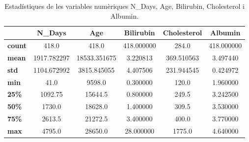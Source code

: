 \begin{table}[H]
\centering
\begin{tabular}{|l|c|c|c|c|c|}
\hline
\textbf{} & \textbf{N\_Days} & \textbf{Age} & \textbf{Bilirubin} & \textbf{Cholesterol} & \textbf{Albumin} \\ \hline
\textbf{count} & 418.0 & 418.0 & 418.000000 & 284.0 & 418.000000 \\ \hline
\textbf{mean} & 1917.782297 & 18533.351675 & 3.220813 & 369.510563 & 3.497440 \\ \hline
\textbf{std} & 1104.672992 & 3815.845055 & 4.407506 & 231.944545 & 0.424972 \\ \hline
\textbf{min} & 41.0 & 9598.0 & 0.300000 & 120.0 & 1.960000 \\ \hline
\textbf{25\%} & 1092.75 & 15644.5 & 0.800000 & 249.5 & 
3.242500 \\ \hline
\textbf{50\%} & 1730.0 & 18628.0 & 1.400000 & 309.5 & 
3.530000 \\ \hline
\textbf{75\%} & 2613.5 & 21272.5 & 3.400000 & 400.0 & 
3.770000 \\ \hline
\textbf{max} & 4795.0 & 28650.0 & 28.000000 & 1775.0 & 
4.640000 \\ \hline
\end{tabular}
\caption{Estadístiques de les variables numèriques N\_Days, Age, Bilirubin, Cholesterol i Albumin.}
\label{tab:num-stats-1}
\end{table}

